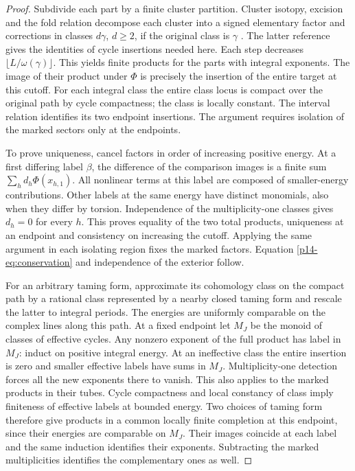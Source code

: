 \begin{proof}
Subdivide each part by a finite cluster partition. Cluster isotopy,
excision and the fold relation decompose each cluster into a signed
elementary factor and corrections in classes \(d\gamma\), \(d\geq2\),
if the original class is \(\gamma\)
\cite[Propositions~3.18, 3.21 and Theorem~3.25]{diw}
\cite[\S4]{WueProduct}. The latter reference gives the identities of
cycle insertions needed here. Each step decreases
\(\lfloor L/\omega(\gamma)\rfloor\). This yields finite products for
the parts with integral exponents. The image of their product under
\(\Phi\) is precisely the insertion of the entire target at this
cutoff. For each integral class the entire class locus is compact
over the original path by cycle compactness; the class is locally
constant. The interval relation identifies its two endpoint
insertions. The argument requires isolation of the marked sectors
only at the endpoints.

To prove uniqueness, cancel factors in order of increasing positive
energy. At a first differing label \(\beta\), the difference of
the comparison images is a finite sum
\(\sum_h d_h\Phi(x_{h,1})\). All nonlinear terms at this label are
composed of smaller-energy contributions. Other labels at the same
energy have distinct monomials, also when they differ by torsion.
Independence of the multiplicity-one classes
\cite[Theorem~5.1]{WueProduct} gives \(d_h=0\) for every \(h\). This
proves equality of the two total products, uniqueness at an endpoint
and consistency on increasing the cutoff. Applying the same argument
in each isolating region fixes the marked factors. Equation
\eqref{p14-eq:conservation} and independence of the exterior follow.

For an arbitrary taming form, approximate its cohomology class on
the compact path by a rational class represented by a nearby closed
taming form and rescale the latter to integral periods. The energies
are uniformly comparable on the complex lines along this path. At a
fixed endpoint let \(M_J\) be the monoid of classes of effective cycles.
Any nonzero exponent of the full product has label in \(M_J\):
induct on positive integral energy. At an ineffective class the entire
insertion is zero and smaller effective labels have sums in \(M_J\).
Multiplicity-one detection forces all the new exponents there to
vanish. This also applies to the marked products in their tubes.
Cycle compactness and local constancy of class imply finiteness of
effective labels at bounded energy. Two choices of taming form
therefore give products in a common locally finite completion at this
endpoint, since their energies are comparable on \(M_J\).
Their images coincide at each label and the same induction identifies
their exponents. Subtracting the marked multiplicities identifies the
complementary ones as well.
\end{proof}

